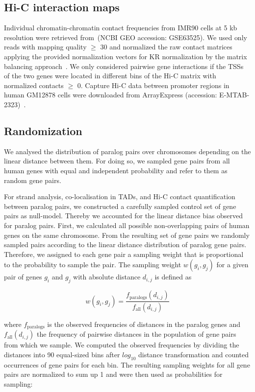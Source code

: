 \documentclass[a4paper,twoside=true,openright,parskip=full,chapterprefix=true,11pt,headings=normal,bibliography=totoc,listof=totoc,titlepage=on,captions=tableabove,draft=false]{scrreprt}
\theoremstyle{definition}
\theoremstyle{definition}
\theoremstyle{definition}
\theoremstyle{remark}
\begin{document}
\hypertarget{hi-c-interaction-maps}{%
\subsection{Hi-C interaction maps}\label{hi-c-interaction-maps}}

Individual chromatin-chromatin contact frequencies from IMR90 cells at 5
kb resolution were retrieved from~\citep{Rao2014}(NCBI GEO accession:
GSE63525). We used only reads with mapping quality \(\geq\) 30 and
normalized the raw contact matrices applying the provided normalization
vectors for KR normalization by the matrix balancing
approach~\citep{Knight2013}. We only considered pairwise gene
interactions if the TSSs of the two genes were located in different bins
of the Hi-C matrix with normalized contacts \(\geq\) 0. Capture Hi-C
data between promoter regions in human GM12878 cells were downloaded
from ArrayExpress (accession: E-MTAB-2323)~\citep{Mifsud2015}.

\hypertarget{randomization}{%
\subsection{Randomization}\label{randomization}}

We analysed the distribution of paralog pairs over chromosomes depending
on the linear distance between them. For doing so, we sampled gene pairs
from all human genes with equal and independent probability and refer to
them as random gene pairs.

For strand analysis, co-localisation in TADs, and Hi-C contact
quantification between paralog pairs, we constructed a carefully sampled
control set of gene pairs as null-model. Thereby we accounted for the
linear distance bias observed for paralog pairs. First, we calculated
all possible non-overlapping pairs of human genes on the same
chromosome. From the resulting set of gene pairs we randomly sampled
pairs according to the linear distance distribution of paralog gene
pairs. Therefore, we assigned to each gene pair a sampling weight that
is proportional to the probability to sample the pair. The sampling
weight \(w(g_{i}, g_{j})\) for a given pair of genes \(g_{i}\) and
\(g_{j}\) with absolute distance \(d_{i,j}\) is defined as

\[
w(g_{i}, g_{j}) = \frac{ f_{\mathrm{paralogs}}(d_{i,j}) }{f_{\mathrm{all}}(d_{i,j})}
\]

where \(f_{\mathrm{paralogs}}\) is the observed frequencies of distances
in the paralog genes and \(f_{\mathrm{all}}(d_{i,j})\) the frequency of
pairwise distances in the population of gene pairs from which we sample.
We computed the observed frequencies by dividing the distances into 90
equal-sized bins after \(log_{10}\) distance transformation and counted
occurrences of gene pairs for each bin. The resulting sampling weights
for all gene pairs are normalized to sum up 1 and were then used as
probabilities for sampling:
\end{document}
